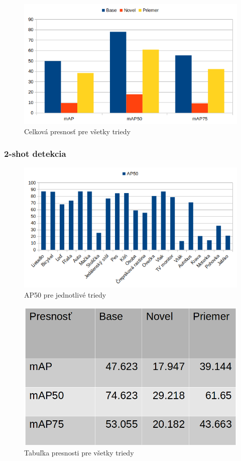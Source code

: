 \begin{figure}[H]
\includegraphics[width=\textwidth]{images/1_shot_meanAP.png}
\centering
\caption{Celková presnosť pre všetky triedy}
\label{fig:image20}
\end{figure}


\subsubsection{2-shot detekcia}

\begin{figure}[H]
\includegraphics[width=\textwidth]{images/2_shot_classes_AP50.png}
\centering
\caption{AP50 pre jednotlivé triedy}
\label{fig:image21}
\end{figure}

\begin{figure}[H]
\includegraphics[width=\textwidth]{images/2shot_table_meanAP.png}
\centering
\caption{Tabuľka presnosti pre všetky triedy}
\label{fig:image22}
\end{figure}

